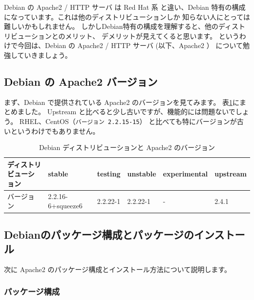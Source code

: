 \documentclass[mingoth,a4paper]{jsarticle}
\begin{document}
Debian の Apache2 / HTTP サーバ は Red Hat 系 と違い、Debian 特有の構成になっています。これは他のディストリビューションしか
知らない人にとっては難しいかもしれません。
しかしDebian特有の構成を理解すると、他のディストリビューションとのメリット、
デメリットが見えてくると思います。
というわけで今回は、Debian の Apache2 / HTTP サーバ (以下、Apache2 ） について勉強していきましょう。

\subsection{Debian の Apache2 バージョン}

まず、Debian で提供されている Apache2 のバージョンを見てみます。
表\ref{tab:apache-version}にまとめました。
Upstream と比べると少し古いですが、機能的には問題ないでしょう。
RHEL、CentOS（\texttt{バージョン 2.2.15-15}）
と比べても特にバージョンが古いというわけでもありません。

\begin{table}[ht]
\begin{center}
\begin{tabular}{|l|l|l|l|l|l|}
\hline
ディストリビューション & stable & testing &unstable & experimental & upstream\\
\hline \hline
バージョン & 2.2.16-6+squeeze6 & 2.2.22-1 & 2.2.22-1 & - & 2.4.1 \\
\hline
\end{tabular}
\caption{\label{tab:apache-version}Debian ディストリビューションと Apache2 のバージョン}
\end{center}
\end{table}

\subsection{Debianのパッケージ構成とパッケージのインストール}

次に Apache2 のパッケージ構成とインストール方法について説明します。

\subsubsection{パッケージ構成}
\end{document}
